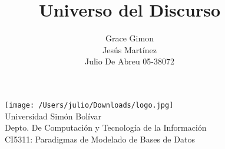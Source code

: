 \documentclass[12pt,a4paper,spanish]{article}
\begin{document}
\begin{figure}
  \centering
    \texttt{[image: /Users/julio/Downloads/logo.jpg]}
     \\ Universidad Sim\'on Bol\'ivar
     \\ Depto. De Computaci\'on y Tecnolog\'ia de la Informaci\'on
     \\ CI5311: Paradigmas de Modelado de Bases de Datos
\end{figure} 

\title{Universo del Discurso}
\author{Grace Gimon \\
        Jes\'us Mart\'inez \\
        Julio De Abreu 05-38072}

\maketitle
\end{document}

